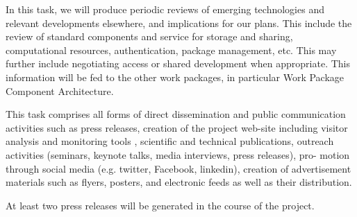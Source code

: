 \begin{workpackage}
\begin{tasklist}
\begin{task}[title=Reviewing emerging technologies]
  In this task, we will produce periodic reviews of emerging technologies and relevant
  developments elsewhere, and implications for our plans. This include the review of
  standard components and service for storage and sharing, computational resources,
  authentication, package management, etc. This may further include negotiating access or
  shared development when appropriate. This information will be fed to the other work
  packages, in particular Work Package~ Component
  Architecture.
\end{task}

\begin{task}[title=Dissemination and Communication activities]


  This task comprises all forms of direct dissemination and public communication
  activities such as press releases, creation of the project web-site including visitor
  analysis and monitoring tools , scientific and technical publications, outreach
  activities (seminars, keynote talks, media interviews, press releases), pro- motion
  through social media (e.g. twitter, Facebook, linkedin), creation of advertisement
  materials such as flyers, posters, and electronic feeds as well as their distribution.


  At least two press releases will be generated in the course of the project.
  
\end{task}


\end{tasklist}
\end{workpackage}
